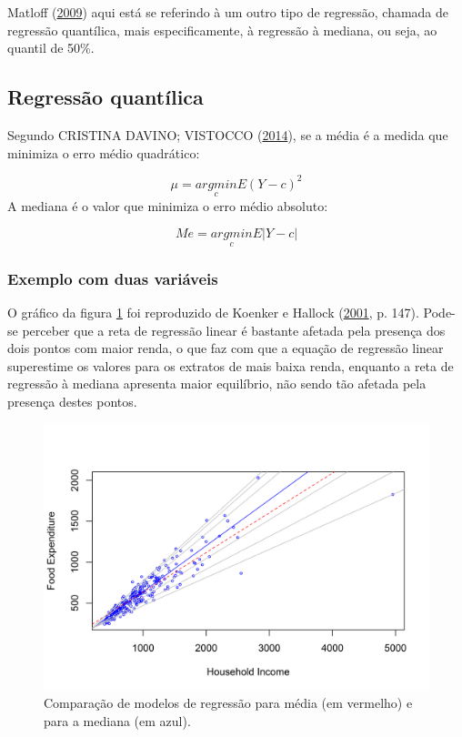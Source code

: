 \documentclass[a4paper]{article}
\begin{document}
Matloff (\protect\hyperlink{ref-matloff2009}{2009}) aqui está se
referindo à um outro tipo de regressão, chamada de regressão quantílica,
mais especificamente, à regressão à mediana, ou seja, ao quantil de
50\%.

\subsection{Regressão quantílica}\label{regressao-quantilica}

Segundo CRISTINA DAVINO; VISTOCCO (\protect\hyperlink{ref-QR}{2014}), se
a média é a medida que minimiza o erro médio quadrático:

\[\mu = \underset{c}{argmin} E(Y - c)^2\] A mediana é o valor que
minimiza o erro médio absoluto:

\[Me = \underset{c}{argmin} E|Y-c|\]

\subsubsection{Exemplo com duas
variáveis}\label{exemplo-com-duas-variaveis}

O gráfico da figura \ref{fig:engel} foi reproduzido de Koenker e Hallock
(\protect\hyperlink{ref-koenker}{2001}, p. 147). Pode-se perceber que a
reta de regressão linear é bastante afetada pela presença dos dois
pontos com maior renda, o que faz com que a equação de regressão linear
superestime os valores para os extratos de mais baixa renda, enquanto a
reta de regressão à mediana apresenta maior equilíbrio, não sendo tão
afetada pela presença destes pontos.

\begin{figure}[H]

{\centering \includegraphics[width=0.7\linewidth]{images/engel-1} 

}

\caption{Comparação de modelos de regressão para média (em vermelho) e para a mediana (em azul).}\label{fig:engel}
\end{figure}
\end{document}

